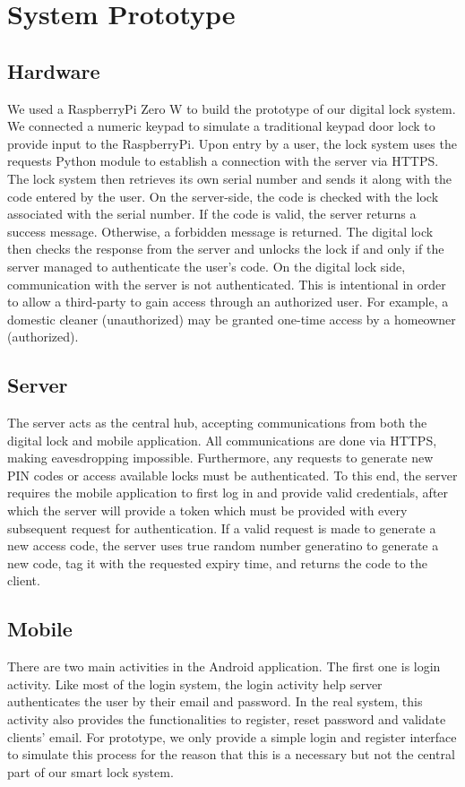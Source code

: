 \documentclass[conference]{IEEEtran}
\begin{document}
\section{System Prototype}

\subsection{Hardware}
	We used a RaspberryPi Zero W to build the prototype of our digital lock system. We connected a numeric keypad to simulate a traditional keypad door lock to provide input to the RaspberryPi. Upon entry by a user, the lock system uses the requests Python module to establish a connection with the server via HTTPS. The lock system then retrieves its own serial number and sends it along with the code entered by the user. On the server-side, the code is checked with the lock associated with the serial number. If the code is valid, the server returns a success message. Otherwise, a forbidden message is returned. The digital lock then checks the response from the server and unlocks the lock if and only if the server managed to authenticate the user’s code. On the digital lock side, communication with the server is not authenticated. This is intentional in order to allow a third-party to gain access through an authorized user. For example, a domestic cleaner (unauthorized) may be granted one-time access by a homeowner (authorized).
\subsection{Server}
The server acts as the central hub, accepting communications from both the digital lock and mobile application. All communications are done via HTTPS, making eavesdropping impossible. Furthermore, any requests to generate new PIN codes or access available locks must be authenticated. To this end, the server requires the mobile application to first log in and provide valid credentials, after which the server will provide a token which must be provided with every subsequent request for authentication. If a valid request is made to generate a new access code, the server uses true random number generatino to generate a new code, tag it with the requested expiry time, and returns the code to the client.

\subsection{Mobile}
There are two main activities in the Android application. The first one is login activity. Like most of the login system, the login activity help server authenticates the user by their email and password. In the real system, this activity also provides the functionalities to register, reset password and validate clients’ email. For prototype, we only provide a simple login and register interface to simulate this process for the reason that this is a necessary but not the central part of our smart lock system.
\end{document}
